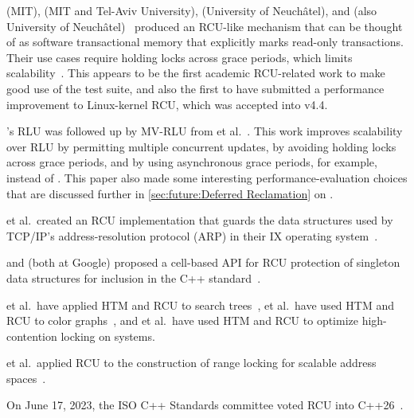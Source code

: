  (MIT),  (MIT and Tel-Aviv University),
 (University of Neuch\^{a}tel), and  (also
University of Neuch\^{a}tel)~\cite{Matveev:2015:RLS:2815400.2815406}
produced an RCU-like mechanism that can be thought of as
software transactional memory that explicitly marks
read-only transactions.
Their use cases require holding locks across grace periods, which limits
scalability~\cite{PaulEMcKenney2015ReadMostly,PaulEMcKenney2015ReadMostlySidebar}.
This appears to be the first academic RCU-related work to
make good use of the  test suite, and also the
first to have submitted a performance improvement to Linux-kernel
RCU, which was accepted into v4.4.

's RLU was followed up by MV-RLU from
 et al.~\cite{Kim:2019:MSR:3297858.3304040}.
This work improves scalability over RLU by permitting multiple concurrent
updates, by avoiding holding locks across grace periods, and by using
asynchronous grace periods, for example,  instead of
.
This paper also made some interesting performance-evaluation choices that
are discussed further in
\cref{sec:future:Deferred Reclamation}
on
.

 et al.~created an RCU implementation that guards the
data structures used by TCP/IP's address-resolution protocol (ARP)
in their IX operating system~\cite{Belay:2016:IOS:3014162.2997641}.

 and  (both at Google) proposed
a cell-based API for RCU
protection of singleton data structures for inclusion in the
C++ standard~\cite{GeoffRomer2018C++DeferredReclamationP0561R4}.

 et al.~have applied
HTM and RCU to search trees~\cite{Siakavaras2017CombiningHA,DimitriosSiakavaras2020RCU-HTM-B+Trees},
 et al.~have used HTM and RCU to color
graphs~\cite{ChristinaGiannoula2018HTM-RCU-graphcoloring},
and
 et al.~have used HTM and RCU to optimize high-contention
locking on  systems.

 et al.~applied RCU to the construction of range locking
for scalable address spaces~\cite{AlexKogan2020RCUrangelocks}.

On June 17, 2023, the ISO C++ Standards committee voted RCU into
C++26~\cite{PaulEMcKennney2023C++26RCU4}.

